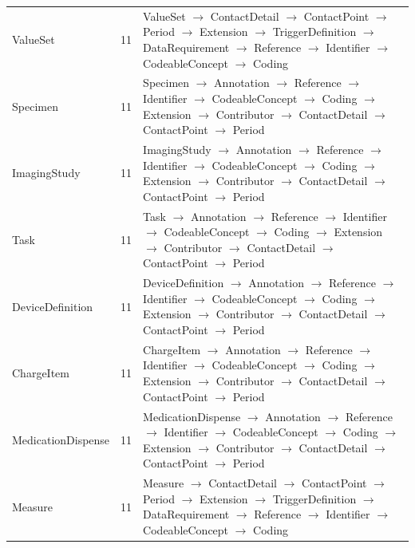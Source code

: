 \begin{longtable}{lrl}
ValueSet & 11 & ValueSet $\rightarrow$ ContactDetail $\rightarrow$ ContactPoint $\rightarrow$ Period $\rightarrow$ Extension $\rightarrow$ TriggerDefinition $\rightarrow$ DataRequirement $\rightarrow$ Reference $\rightarrow$ Identifier $\rightarrow$ CodeableConcept $\rightarrow$ Coding \\
Specimen & 11 & Specimen $\rightarrow$ Annotation $\rightarrow$ Reference $\rightarrow$ Identifier $\rightarrow$ CodeableConcept $\rightarrow$ Coding $\rightarrow$ Extension $\rightarrow$ Contributor $\rightarrow$ ContactDetail $\rightarrow$ ContactPoint $\rightarrow$ Period \\
ImagingStudy & 11 & ImagingStudy $\rightarrow$ Annotation $\rightarrow$ Reference $\rightarrow$ Identifier $\rightarrow$ CodeableConcept $\rightarrow$ Coding $\rightarrow$ Extension $\rightarrow$ Contributor $\rightarrow$ ContactDetail $\rightarrow$ ContactPoint $\rightarrow$ Period \\
Task & 11 & Task $\rightarrow$ Annotation $\rightarrow$ Reference $\rightarrow$ Identifier $\rightarrow$ CodeableConcept $\rightarrow$ Coding $\rightarrow$ Extension $\rightarrow$ Contributor $\rightarrow$ ContactDetail $\rightarrow$ ContactPoint $\rightarrow$ Period \\
DeviceDefinition & 11 & DeviceDefinition $\rightarrow$ Annotation $\rightarrow$ Reference $\rightarrow$ Identifier $\rightarrow$ CodeableConcept $\rightarrow$ Coding $\rightarrow$ Extension $\rightarrow$ Contributor $\rightarrow$ ContactDetail $\rightarrow$ ContactPoint $\rightarrow$ Period \\
ChargeItem & 11 & ChargeItem $\rightarrow$ Annotation $\rightarrow$ Reference $\rightarrow$ Identifier $\rightarrow$ CodeableConcept $\rightarrow$ Coding $\rightarrow$ Extension $\rightarrow$ Contributor $\rightarrow$ ContactDetail $\rightarrow$ ContactPoint $\rightarrow$ Period \\
MedicationDispense & 11 & MedicationDispense $\rightarrow$ Annotation $\rightarrow$ Reference $\rightarrow$ Identifier $\rightarrow$ CodeableConcept $\rightarrow$ Coding $\rightarrow$ Extension $\rightarrow$ Contributor $\rightarrow$ ContactDetail $\rightarrow$ ContactPoint $\rightarrow$ Period \\
Measure & 11 & Measure $\rightarrow$ ContactDetail $\rightarrow$ ContactPoint $\rightarrow$ Period $\rightarrow$ Extension $\rightarrow$ TriggerDefinition $\rightarrow$ DataRequirement $\rightarrow$ Reference $\rightarrow$ Identifier $\rightarrow$ CodeableConcept $\rightarrow$ Coding \\

\end{longtable}
